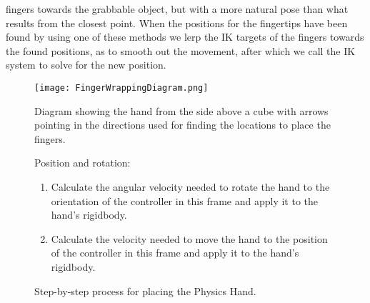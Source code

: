 fingers towards the grabbable object, but with a more natural pose than what results from the closest point. When the positions for the fingertips have been found by using one of these methods we lerp the IK targets of the fingers towards the found positions, as to smooth out the movement, after which we call the IK system to solve for the new position.

\begin{figure}[H]
\centering
\texttt{[image: FingerWrappingDiagram.png]}
\caption{Diagram showing the hand from the side above a cube with arrows pointing in the directions used for finding the locations to place the fingers.}
\label{fig:physicsHandFingerPlacementDiagram}
\end{figure}

\begin{figure}[H]
\centering
\small
\begin{flushleft}
Position and rotation:
\end{flushleft}
\begin{enumerate}[noitemsep]
\item Calculate the angular velocity needed to rotate the hand to the orientation of the controller in this frame and apply it to the hand's rigidbody.
\item Calculate the velocity needed to move the hand to the position of the controller in this frame and apply it to the hand's rigidbody.
\end{enumerate}
\caption{Step-by-step process for placing the Physics Hand.}
\label{fig:stepByStepPhysicsHandPositionRotation}
\end{figure}

